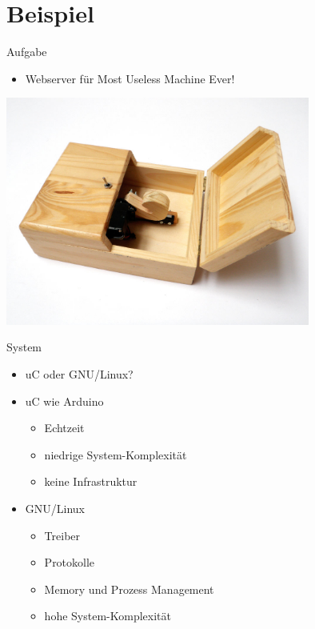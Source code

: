 

\section{Beispiel}

\begin{frame}{Aufgabe}
	\begin{itemize}
		\item Webserver für Most Useless Machine Ever!
	\end{itemize}
	\begin{center}
		\includegraphics[width=0.75\textwidth]{res/mume.jpg}
		\cite{mumePic}
	\end{center}
\end{frame}

\begin{frame}{System}
	\begin{itemize}
		\item uC oder GNU/Linux?
		\item uC wie Arduino
		\begin{itemize}
			\item Echtzeit
			\item niedrige System-Komplexität
			\item keine Infrastruktur
		\end{itemize}
		\item GNU/Linux
		\begin{itemize}
			\item Treiber
			\item Protokolle
			\item Memory und Prozess Management
			\item hohe System-Komplexität
		\end{itemize}
	\end{itemize}
\end{frame}

